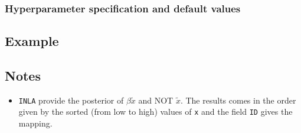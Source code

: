 \documentclass[a4paper,11pt]{article}
\begin{document}
\subsubsection*{Hyperparameter specification and default values}


\subsection*{Example}



\subsection*{Notes}

\begin{itemize}
\item \texttt{INLA} provide the posterior of $\beta \widetilde{x}$ and
    NOT $\widetilde{x}$.  The results comes in the order given by the
    sorted (from low to high) values of \texttt{x} and the field
    \texttt{ID} gives the mapping.
\end{itemize}
\end{document}
